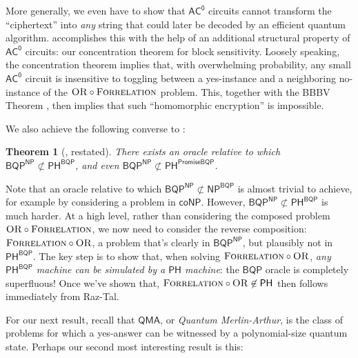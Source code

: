 \documentclass[11pt]{article}%
\newtheorem{theorem}{Theorem}
\newcommand{\OR}{\normalfont\textsc{OR}}
\newcommand{\Forrelation}{\normalfont\textsc{Forrelation}}
\begin{document}
More generally, we even have to show that $\mathsf{AC^0}$ circuits cannot transform the ``ciphertext'' into \textit{any} string that could later be decoded by an efficient quantum algorithm.  accomplishes this with the help of an additional structural property of $\mathsf{AC^0}$ circuits: our concentration theorem for block sensitivity. Loosely speaking, the concentration theorem implies that, with
overwhelming probability, any small $\mathsf{AC^0}$ circuit is insensitive to toggling between a yes-instance and a neighboring no-instance of the $\OR \circ \Forrelation$ problem.  This, together with the BBBV Theorem \cite{BBBV97}, then implies that such ``homomorphic encryption'' is impossible.

\bigskip

We also achieve the following converse to :

\begin{theorem}[, restated]
\label{thm:bqp^np_not_in_ph^bqp_intro}
There exists an oracle relative to which $\mathsf{BQP}^\mathsf{NP} \not\subset \mathsf{PH}^\mathsf{BQP}$, and even $\mathsf{BQP}^\mathsf{NP} \not\subset \mathsf{PH}^\mathsf{PromiseBQP}$.
\end{theorem}

Note that an oracle relative to which $\mathsf{BQP}^\mathsf{NP} \not\subset \mathsf{NP}^\mathsf{BQP}$ is almost trivial to achieve, for example by considering a problem in $\mathsf{coNP}$.  However, $\mathsf{BQP}^\mathsf{NP} \not\subset \mathsf{PH}^\mathsf{BQP}$ is much harder.  At a high level, rather than considering the composed problem $\OR \circ \Forrelation$, we now need to consider the reverse composition: $\Forrelation \circ \OR$, a problem that's clearly in $\mathsf{BQP}^\mathsf{NP}$, but plausibly not in $\mathsf{PH}^\mathsf{BQP}$. The key step is to show that, when solving $\Forrelation \circ \OR$, \textit{any $\mathsf{PH}^\mathsf{BQP}$ machine can be simulated by a $\mathsf{PH}$ machine}: the $\mathsf{BQP}$ oracle is completely superfluous!  Once we've shown that, $\Forrelation \circ \OR \not \in \mathsf{PH}$ then follows immediately from Raz-Tal.

\bigskip

For our next result, recall that $\mathsf{QMA}$, or \textit{Quantum Merlin-Arthur}, is the class of problems for which a yes-answer can be witnessed by a polynomial-size quantum state. Perhaps our second most interesting result is this:
\end{document}
